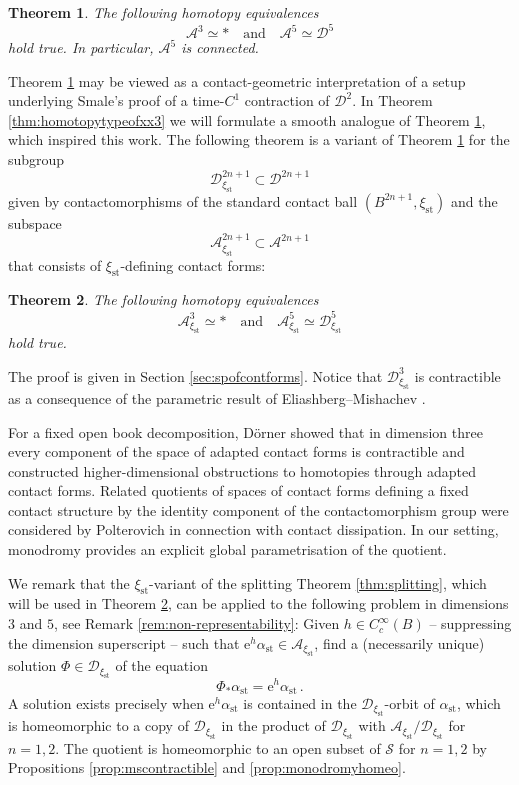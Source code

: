 \documentclass{amsart}
\newtheorem{thmintr}{Theorem}
\theoremstyle{definition}
\newcommand{\AAA}{\mathcal A}
\newcommand{\DD}{\mathcal D}
\newcommand{\rme}{\mathrm e}
\renewcommand{\SS}{\mathcal S}
\DeclareMathOperator{\st}{\mathrm{st}}
\begin{document}
\begin{thmintr}
\label{thmintr:homotopytypeofaaa}
The following homotopy equivalences
  \[
  \AAA^3\simeq*
  \quad\text{and}\quad
  \AAA^5\simeq\DD^5
  \]
hold true.
In particular, $\AAA^5$ is connected.
\end{thmintr}


Theorem \ref{thmintr:homotopytypeofaaa}
may be viewed as a contact-geometric interpretation
of a setup underlying Smale's proof \cite{sm59}
of a time-$C^1$ contraction of $\DD^2$.
In Theorem \ref{thm:homotopytypeofxx3}
we will formulate a smooth analogue of
Theorem \ref{thmintr:homotopytypeofaaa},
which inspired this work.
The following theorem is a variant of
Theorem \ref{thmintr:homotopytypeofaaa}
for the subgroup
\[
\DD^{2n+1}_{\xi_{\st}}\subset\DD^{2n+1}
\]
given by contactomorphisms
of the standard contact ball $(B^{2n+1},\xi_{\st})$
and the subspace
\[
\AAA^{2n+1}_{\xi_{\st}}\subset\AAA^{2n+1}
\]
that consists of $\xi_{\st}$-defining contact forms:


\begin{thmintr}
\label{thmintr:homotopytypeofaaacont}
The following homotopy equivalences
  \[
  \AAA_{\xi_{\st}}^3\simeq*
  \quad\text{and}\quad
  \AAA_{\xi_{\st}}^5\simeq\DD_{\xi_{\st}}^5
  \]
hold true.
\end{thmintr}


The proof is given in Section \ref{sec:spofcontforms}.
Notice that $\DD_{\xi_{\st}}^3$ is contractible
as a consequence of the parametric result
of Eliashberg--Mishachev \cite{em}.

For a fixed open book decomposition,
D\"orner \cite{doe14} showed that in dimension three
every component of the space of adapted contact forms
is contractible and constructed higher-dimensional
obstructions to homotopies through adapted contact forms.
Related quotients of spaces of contact forms
defining a fixed contact structure
by the identity component of the contactomorphism group
were considered by Polterovich
\cite[Section~3]{pol02}
in connection with contact dissipation.
In our setting,
monodromy provides an explicit global parametrisation
of the quotient.

We remark that the $\xi_{\st}$-variant of
the splitting Theorem \ref{thm:splitting},
which will be used in
Theorem \ref{thmintr:homotopytypeofaaacont},
can be applied to the following problem
in dimensions $3$ and $5$,
see Remark \ref{rem:non-representability}:
Given $h\in C_c^{\infty}(B)$ --
suppressing the dimension superscript  --
such that $\rme^h\alpha_{\st}\in\AAA_{\xi_{\st}}$,
find a (necessarily unique) solution $\Phi\in\DD_{\xi_{\st}}$
of the equation
\[
\Phi_*\alpha_{\st}=\rme^h\alpha_{\st}
\,.
\]
A solution exists precisely when
$\rme^h\alpha_{\st}$ is contained in the
$\DD_{\xi_{\st}}$-orbit of $\alpha_{\st}$,
which is homeomorphic to a copy of $\DD_{\xi_{\st}}$
in the product of $\DD_{\xi_{\st}}$ with
$\AAA_{\xi_{\st}}/\DD_{\xi_{\st}}$
for $n=1,2$.
The quotient is homeomorphic to an open subset
of $\SS$ for $n=1,2$ by
Propositions \ref{prop:mscontractible}
and \ref{prop:monodromyhomeo}.
\end{document}
